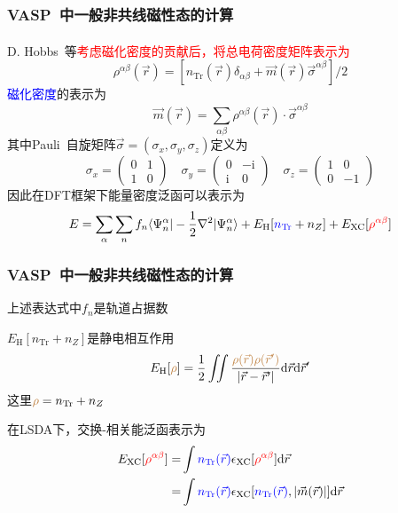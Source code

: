 \documentclass[cjk,slidestop,compress,mathserif,blue]{beamer}
\newcommand{\upcite}[1]{\hspace{0ex}\textsuperscript{\cite{#1}}} %
\begin{document}
\frame
{
	\frametitle{\textrm{VASP~}中一般非共线磁性态的计算}
	\textrm{D. Hobbs~}等\upcite{PRB62-11556_2000}\textcolor{red}{考虑磁化密度的贡献后，将总电荷密度矩阵表示为}
	\begin{displaymath}
		\rho^{\alpha\beta}(\vec r)=\left[n_{\mathrm{Tr}}(\vec r)\delta_{\alpha\beta}+\vec m(\vec r)\vec{\sigma}^{\alpha\beta}\right]/2
	\end{displaymath}
	\textcolor{blue}{磁化密度}的表示为
	\begin{displaymath}
		\vec m(\vec r)=\sum_{\alpha\beta}\rho^{\alpha\beta}(\vec r)\cdot\vec{\sigma}^{\alpha\beta}
	\end{displaymath}
	其中\textrm{Pauli~}自旋矩阵$\vec{\sigma}=(\sigma_x,\sigma_y,\sigma_z)$定义为
	\begin{displaymath}
		\sigma_x=\left( 
		\begin{matrix}
			0 &1\\
			1 &0
		\end{matrix}
		\right)\quad
		\sigma_y=\left( 
		\begin{matrix}
			0 &-\mathrm{i}\\
			\mathrm{i} &0
		\end{matrix}
		\right)\quad
		\sigma_z=\left( 
		\begin{matrix}
			1 &0\\
			0 &-1
		\end{matrix}
		\right)
	\end{displaymath}
	因此在\textrm{DFT}框架下能量密度泛函可以表示为
	\begin{displaymath}
		E=\sum_{\alpha}\sum_{n}f_n\langle\Psi_n^{\alpha}|-\frac12\nabla^2|\Psi_n^{\alpha}\rangle+E_{\mathrm{H}}[\textcolor{blue}{n_{\mathrm{Tr}}}+n_Z]+E_{\mathrm{XC}}[\textcolor{red}{\rho^{\alpha\beta}}]
	\end{displaymath}
}

\frame
{
	\frametitle{\textrm{VASP~}中一般非共线磁性态的计算}
	上述表达式中$f_n$是轨道占据数
	
	$E_{\mathrm{H}}[n_{\mathrm{Tr}}+n_Z]$是静电相互作用
	\begin{displaymath}
		E_{\mathrm{H}}[\textcolor{brown}{\rho}]=\frac12\iint\frac{\textcolor{brown}{\rho(\vec r)\rho(\vec r^{\prime})}}{|\vec r-\vec r^{\prime}|}\mathrm{d}\vec r\mathrm{d}\vec r^{\prime}
	\end{displaymath}
	这里$\textcolor{brown}{\rho}=n_{\mathrm{Tr}}+n_Z$

	在\textrm{LSDA}下，交换-相关能泛函表示为
	\begin{displaymath}
		\begin{aligned}
			E_{\mathrm{XC}}[\textcolor{red}{\rho^{\alpha\beta}}]=&\int\textcolor{blue}{n_{\mathrm{Tr}}(\vec r)}\epsilon_{\mathrm{XC}}[\textcolor{red}{\rho^{\alpha\beta}}]\mathrm{d}\vec r\\
			=&\int\textcolor{blue}{n_{\mathrm{Tr}}(\vec r)}\epsilon_{\mathrm{XC}}[\textcolor{blue}{n_{\mathrm{Tr}}(\vec r)},|\vec m(\vec r)|]\mathrm{d}\vec r
		\end{aligned}
	\end{displaymath}
}
\end{document}
